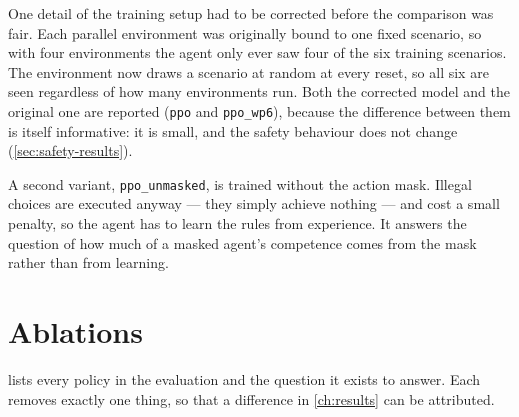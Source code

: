 One detail of the training setup had to be corrected before the comparison was fair. Each parallel
environment was originally bound to one fixed scenario, so with four environments the agent only
ever saw four of the six training scenarios. The environment now draws a scenario at random at
every reset, so all six are seen regardless of how many environments run. Both the corrected model
and the original one are reported (\texttt{ppo} and \texttt{ppo\_wp6}), because the difference
between them is itself informative: it is small, and the safety behaviour does not change
(\cref{sec:safety-results}).

A second variant, \texttt{ppo\_unmasked}, is trained without the action mask. Illegal choices are
executed anyway --- they simply achieve nothing --- and cost a small penalty, so the agent has to
learn the rules from experience. It answers the question of how much of a masked agent's
competence comes from the mask rather than from learning.

\section{Ablations}
\label{sec:ablations}

 lists every policy in the evaluation and the question it exists to answer.
Each removes exactly one thing, so that a difference in \cref{ch:results} can be attributed.


